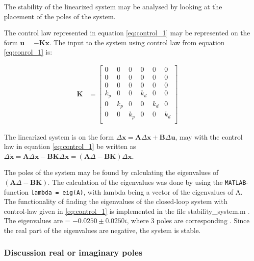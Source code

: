 The stability of the linearized system may be analysed by looking at the placement of the poles of the system.

The control law represented in equation \eqref{eq:control_1} may be represented on the form $ \mathbf{u} = - \mathbf{K} \mathbf{x}$. The input to the system using control law from equation \eqref{eq:conrol_1} is:

\begin{equation}
\begin{aligned}
    \mathbf{K}
    &=
    \begin{bmatrix}
    0 & 0 & 0 & 0 & 0 & 0 \\ 
    0 & 0 & 0 & 0 & 0 & 0 \\ 
    0 & 0 & 0 & 0 & 0 & 0 \\ 
    k_p & 0 & 0 & k_d & 0 & 0 \\ 
    0 & k_p & 0 & 0 & k_d & 0 \\ 
    0 & 0 & k_p & 0 & 0 & k_d \\ 
    \end{bmatrix}
\end{aligned}
\end{equation}

The linearized system is on the form $\Delta \mathbf{x} = \mathbf{A}\Delta \mathbf{x} + \mathbf{B} \Delta \mathbf{u}$, may with the control law in equation \eqref{eq:control_1} be written as $\Delta \dot{\mathbf{x}} = \mathbf{A}\Delta \mathbf{x} - \mathbf{B K} \Delta \mathbf{x} = ( \mathbf{A}\Delta  - \mathbf{B K} ) \Delta \mathbf{x} $.

The poles of the system may be found by calculating the eigenvalues of $( \mathbf{A}\Delta  - \mathbf{B K} )$. The calculation of the eigenvalues was done by using the \texttt{MATLAB}-function \texttt{lambda = eig(A)}, with lambda being a vector of the eigenvalues of A. The functionality of finding the eigenvalues of the closed-loop system with control-law given in \eqref{eq:control_1} is implemented in the file
{\color{blue}  stability\_system.m }. The eigenvalues are = $- 0.0250 \pm 0.0250i$, where 3 poles are corresponding . Since the real part of the eigenvalues are negative, the system is stable.

\subsubsection*{Discussion real or imaginary poles}

